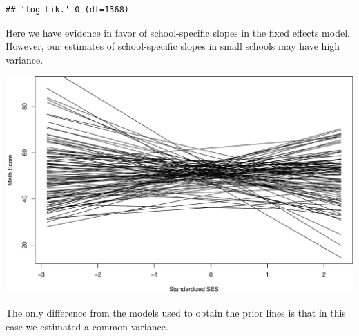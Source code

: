 \documentclass[ignorenonframetext,]{beamer}
\newenvironment{Shaded}{\begin{snugshade}}{\end{snugshade}}
\newcommand{\KeywordTok}[1]{\textcolor[rgb]{0.13,0.29,0.53}{\textbf{#1}}}
\newcommand{\DecValTok}[1]{\textcolor[rgb]{0.00,0.00,0.81}{#1}}
\newcommand{\CommentTok}[1]{\textcolor[rgb]{0.56,0.35,0.01}{\textit{#1}}}
\newcommand{\OperatorTok}[1]{\textcolor[rgb]{0.81,0.36,0.00}{\textbf{#1}}}
\newcommand{\NormalTok}[1]{#1}
\begin{document}
\begin{frame}[fragile]{}

\begin{Shaded}
\end{Shaded}

\begin{verbatim}
## 'log Lik.' 0 (df=1368)
\end{verbatim}

Here we have evidence in favor of school-specific slopes in the fixed
effects model. However, our estimates of school-specific slopes in small
schools may have high variance.

\end{frame}

\begin{frame}{}

\includegraphics{ancova_01_deck_files/figure-beamer/plotslopes-1.pdf}

The only difference from the models used to obtain the prior lines is
that in this case we estimated a common variance.

\end{frame}
\end{document}
